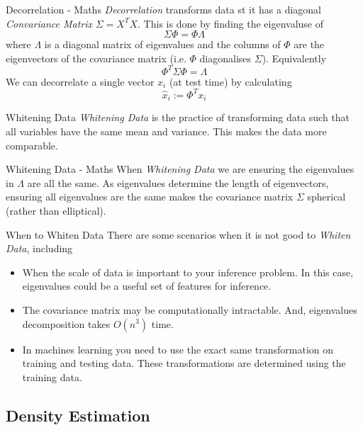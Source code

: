 \documentclass[11pt,a4paper]{article}
\begin{document}
  \begin{proposition}{Decorrelation - Maths}
    \textit{Decorrelation} transforms data st it has a diagonal \textit{Convariance Matrix} $\Sigma=X^TX$. This is done by finding the eigenvaluse of
    \[ \Sigma\Phi=\Phi\Lambda \]
    where $\Lambda$ is a diagonal matrix of eigenvalues and the columns of $\Phi$ are the eigenvectors of the covariance matrix (i.e. $\Phi$ diagonalises $\Sigma$). Equivalently
    \[ \Phi^T\Sigma\Phi=\Lambda \]
    We can decorrelate a single vector $x_i$ (at test time) by calculating
    \[ \hat{x}_i:=\Phi^Tx_i \]
  \end{proposition}

  \begin{definition}{Whitening Data}
    \textit{Whitening Data} is the practice of transforming data such that all variables have the same mean and variance. This makes the data more comparable.
  \end{definition}

  \begin{proposition}{Whitening Data - Maths}
    When \textit{Whitening Data} we are ensuring the eigenvalues in $\Lambda$ are all the same. As eigenvalues determine the length of eigenvectors, ensuring all eigenvalues are the same makes the covariance matrix $\Sigma$ spherical (rather than elliptical).
  \end{proposition}

  \begin{remark}{When to Whiten Data}
    There are some scenarios when it is not good to \textit{Whiten Data}, including
    \begin{itemize}
      \item When the scale of data is important to your inference problem. In this case, eigenvalues could be a useful set of features for inference.
      \item The covariance matrix may be computationally intractable. And, eigenvalues decomposition takes $O(n^3)$ time.
      \item In machines learning you need to use the exact same transformation on training and testing data. These transformations are determined using the training data.
    \end{itemize}
  \end{remark}

\subsection{Density Estimation}
\end{document}
